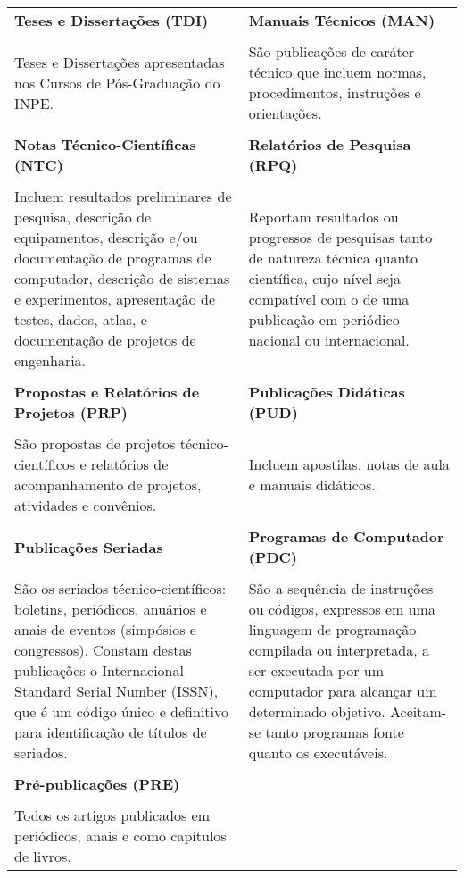 \begin{table}
\begin{center}
\begin{tabularx}{\textwidth}{X X}
  \textbf{Teses e Dissertações (TDI)}              & \textbf{Manuais Técnicos (MAN)}\\
\\
Teses e Dissertações apresentadas nos Cursos de Pós-Graduação do INPE.	&
São publicações de caráter técnico que incluem normas, procedimentos, instruções e orientações.\\
\\
\textbf{Notas Técnico-Científicas (NTC)}           & \textbf{Relatórios de Pesquisa (RPQ)}\\
\\
Incluem resultados preliminares de pesquisa, descrição de equipamentos, descrição e/ou documentação de programas de computador, descrição de sistemas e experimentos, apresentação de testes, dados, atlas, e documentação de projetos de engenharia. 
&	
Reportam resultados ou progressos de pesquisas tanto de natureza técnica quanto científica, cujo nível seja compatível com o de uma publicação em periódico nacional ou internacional.\\
\\
\textbf{Propostas e Relatórios de Projetos (PRP)}	& \textbf{Publicações Didáticas (PUD)} 
\\
\\
São propostas de projetos técnico-científicos e relatórios de acompanhamento de projetos, atividades e convênios.
&	
Incluem apostilas, notas de aula e manuais didáticos. \\
\\         
\textbf{Publicações Seriadas} 	& \textbf{Programas de Computador (PDC)}\\
\\
São os seriados técnico-científicos: boletins, periódicos, anuários e anais de eventos (simpósios e congressos). Constam destas publicações o Internacional Standard Serial Number (ISSN), que é um código único e definitivo para identificação de títulos de seriados. 
&	
São a sequência de instruções ou códigos, expressos em uma linguagem de programação compilada ou interpretada, a ser executada por um computador para alcançar um determinado objetivo. Aceitam-se tanto programas fonte quanto os executáveis.\\
\\
\textbf{Pré-publicações (PRE)} \\
\\
Todos os artigos publicados em  periódicos, anais e como capítulos de livros. \\                 \end{tabularx}
  \end{center}
 \end{table}

